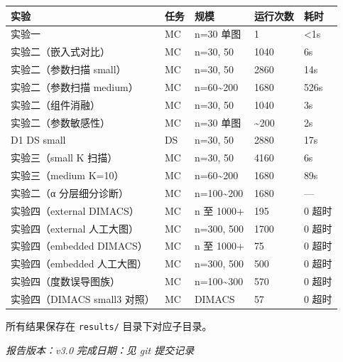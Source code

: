 \documentclass[
  11pt,
]{ctexart}
\newcounter{none} %
\begin{document}
{\def\LTcaptype{none} %
\begin{longtable}[]{@{}lllll@{}}
\toprule\noalign{}
实验 & 任务 & 规模 & 运行次数 & 耗时 \\
\midrule\noalign{}
\endhead
\bottomrule\noalign{}
\endlastfoot
实验一 & MC & n=30 单图 & 1 & \textless1s \\
实验二（嵌入式对比） & MC & n=30, 50 & 1040 & 6s \\
实验二（参数扫描 small） & MC & n=30, 50 & 2860 & 14s \\
实验二（参数扫描 medium） & MC & n=60\textasciitilde200 & 1680 & 526s \\
实验二（组件消融） & MC & n=30, 50 & 1040 & 3s \\
实验二（参数敏感性） & MC & n=30 单图 & \textasciitilde200 & 2s \\
D1 DS small & DS & n=30, 50 & 2880 & 17s \\
实验三（small K 扫描） & MC & n=30, 50 & 4160 & 6s \\
实验三（medium K=10） & MC & n=60\textasciitilde200 & 1680 & 89s \\
实验二（α 分层细分诊断） & MC & n=100\textasciitilde200 & 1680 & --- \\
实验四（external DIMACS） & MC & n 至 1000+ & 195 & 0 超时 \\
实验四（external 人工大图） & MC & n=300, 500 & 1700 & 0 超时 \\
实验四（embedded DIMACS） & MC & n 至 1000+ & 75 & 0 超时 \\
实验四（embedded 人工大图） & MC & n=300, 500 & 500 & 0 超时 \\
实验四（度数误导图族） & MC & n=100\textasciitilde300 & 570 & 0 超时 \\
实验四（DIMACS small3 对照） & MC & DIMACS & 57 & 0 超时 \\
\end{longtable}
}

所有结果保存在 \texttt{results/} 目录下对应子目录。

\emph{报告版本：v3.0} \emph{完成日期：见 git 提交记录}
\end{document}
